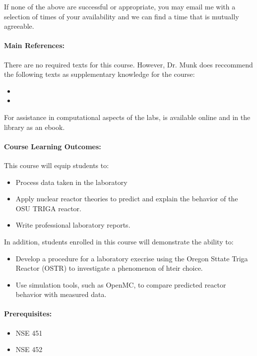 \documentclass[11pt, a4paper]{article}
\begin{document}
If none of the above are successful or appropriate, you may email me with a
selection of times of your availability and we can find a time that is mutually
agreeable.

\paragraph{Main References:}
There are no required texts for this course. However, Dr. Munk does reccommend the following texts as supplementary knowledge for the course:
\begin{itemize}
\item
\item
\end{itemize}

For assistance in computational aspects of the labs, \cite{scopatz_effective_2015} is available online and in the library as an ebook.



\renewcommand{\refname}{\normalfont\selectfont\normalsize}\vspace{-1cm}


\paragraph{Course Learning Outcomes:}

This course will equip students to:
\begin{itemize}
\item Process data taken in the laboratory
\item Apply nuclear reactor theories to predict and explain the behavior of the OSU TRIGA reactor. 
\item Write professional laboratory reports. 
\end{itemize}

In addition, students enrolled in this course will demonstrate the ability to:

\begin{itemize}
\item Develop a procedure for a laboratory execrise using the Oregon Sttate Triga Reactor (OSTR) to investigate a phenomenon of hteir choice.
\item Use simulation tools, such as OpenMC, to compare predicted reactor behavior with measured data. 
\end{itemize}

\paragraph{Prerequisites:}
\begin{itemize}
\item NSE 451
\item NSE 452
\end{itemize}
\end{document}
